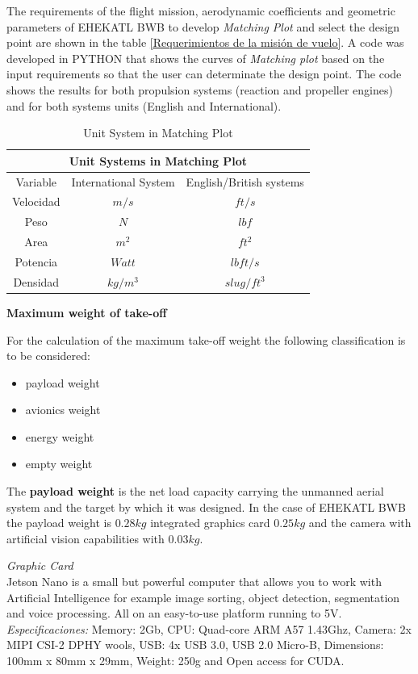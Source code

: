 %
The requirements of the flight mission, aerodynamic coefficients and geometric parameters of EHEKATL BWB to develop \textit{Matching Plot} and select the design point are shown in the table \ref{Requerimientos de la misión de vuelo}.
%
A code was developed in PYTHON that shows the curves of \textit{Matching plot} based on the input requirements so that the user can determinate the design point.
%
The code shows the results for both propulsion systems (reaction and propeller engines) and for both systems units (English and International). 
%
\begin{table}[!h]
    \caption{Unit System in Matching Plot}
    \centering
    \begin{tabular}{|c|c|c|}
    \hline
    \multicolumn{3}{|c|}{Unit Systems in Matching Plot}\\
    \hline
     Variable & International System & English/British systems  \\
     \hline
     Velocidad    & $m/s$ & $ft/s$ \\
     Peso & $N$ & $lbf$ \\
     Area & $m^2$ & $ft^2$ \\
     Potencia & $Watt$ & $lb ft/s$ \\
     Densidad & $kg / m^3$ & $slug/ft^3$\\
     \hline
    \end{tabular}
    \label{US Matching plot}
\end{table}


\medskip
\textbf{Maximum weight of take-off}

For the calculation of the maximum take-off weight the following classification is to be considered:
\begin{itemize}
    \item payload weight
    \item avionics weight
    \item energy weight
    \item empty weight
\end{itemize}


The \textbf{payload weight} is the net load capacity carrying the unmanned aerial system and the target by which it was designed. In the case of EHEKATL BWB the payload weight is $0.28kg$ integrated graphics card $0.25kg$ and the camera with artificial vision capabilities with $0.03kg$. 

\textit{Graphic Card}\\
Jetson Nano is a small but powerful computer that allows you to work with Artificial Intelligence for example image sorting, object detection, segmentation and voice processing. All on an easy-to-use platform running to 5V. 
\textit{Especificaciones:}
Memory: 2Gb, CPU: Quad-core ARM A57 1.43Ghz, Camera: 2x MIPI CSI-2 DPHY wools, USB: 4x USB 3.0, USB 2.0 Micro-B, Dimensions: 100mm x 80mm x 29mm, Weight: 250g and Open access for CUDA. 


